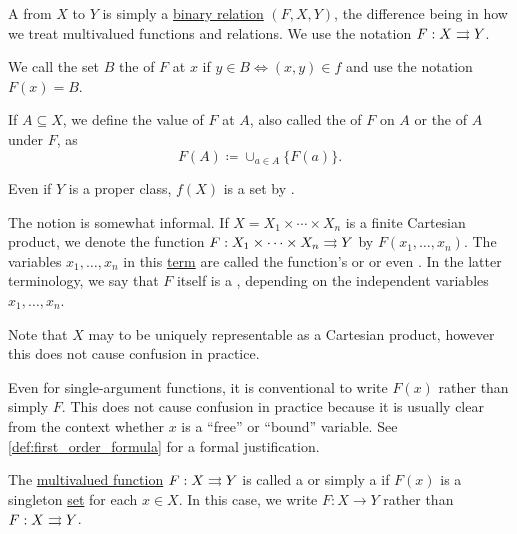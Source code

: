 \begin{definition}\label{def:function}
  A  from \( X \) to \( Y \) is simply a \hyperref[def:binary_relation]{binary relation} \( (F, X, Y) \), the difference being in how we treat multivalued functions and relations. We use the notation \( F: X \rightrightarrows Y \).

  \begin{defenum}[series=def:function]
     We call the set \( B \) the  of \( F \) at \( x \) if \( y \in B \iff (x, y) \in f \) and use the notation \( F(x) = B \).

     If \( A \subseteq X \), we define the value of \( F \) at \( A \), also called the  of \( F \) on \( A \) or the  of \( A \) under \( F \), as
    \begin{equation*}
      F(A) \coloneqq \cup_{a \in A} \{ F(a) \}.
    \end{equation*}

    Even if \( Y \) is a proper class, \( f(X) \) is a set by .

     The notion  is somewhat informal. If \( X = X_1 \times \cdots \times X_n \) is a finite Cartesian product, we denote the function \( F: X_1 \times \cdots \times X_n \rightrightarrows Y \) by \( F(x_1, \ldots, x_n) \). The variables \( x_1, \ldots, x_n \) in this \hyperref[def:first_order_term]{term} are called the function's  or  or even . In the latter terminology, we say that \( F \) itself is a , depending on the independent variables \( x_1, \ldots, x_n \).

    Note that \( X \) may to be uniquely representable as a Cartesian product, however this does not cause confusion in practice.

    Even for single-argument functions, it is conventional to write \( F(x) \) rather than simply \( F \). This does not cause confusion in practice because it is usually clear from the context whether \( x \) is a \enquote{free} or \enquote{bound} variable. See \cref{def:first_order_formula} for a formal justification.

     The \hyperref[def:function/multivalued]{multivalued function} \( F: X \rightrightarrows Y \) is called a  or simply a  if \( F(x) \) is a singleton \hyperref[remark:singleton_sets]{set} for each \( x \in X \). In this case, we write \( F: X \to Y \) rather than \( F: X \rightrightarrows Y \).


\end{defenum}
\end{definition}
